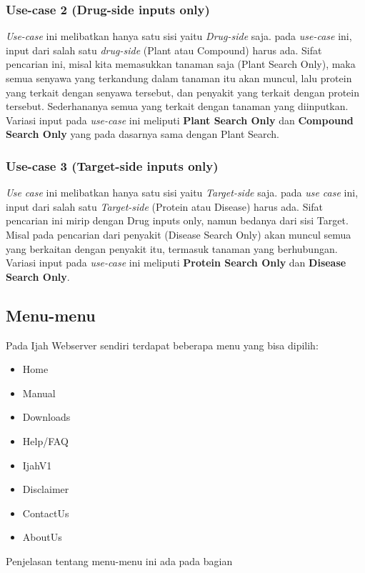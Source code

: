 		\subsubsection{Use-case 2 (Drug-side inputs only)} \label{sssec:drug only}
		\emph{Use-case} ini melibatkan hanya satu sisi yaitu \emph{Drug-side} saja. pada \emph{use-case} ini, input dari salah satu \emph{drug-side} (Plant atau Compound) harus ada. Sifat pencarian ini, misal kita memasukkan tanaman saja (Plant Search Only), maka semua senyawa yang terkandung dalam tanaman itu akan muncul, lalu protein yang terkait dengan senyawa tersebut, dan penyakit yang terkait dengan protein tersebut. Sederhananya semua yang terkait dengan tanaman yang diinputkan. Variasi input pada \emph{use-case} ini meliputi \textbf{Plant Search Only} dan \textbf{Compound Search Only} yang pada dasarnya sama dengan Plant Search.
		\subsubsection{Use-case 3 (Target-side inputs only)} \label{sssec:target only}
		\emph{Use case} ini melibatkan hanya satu sisi yaitu \emph{Target-side} saja. pada \emph{use case} ini, input dari salah satu \emph{Target-side} (Protein atau Disease) harus ada. Sifat pencarian ini mirip dengan Drug inputs only, namun bedanya dari sisi Target. Misal pada pencarian dari penyakit (Disease Search Only) akan muncul semua yang berkaitan dengan penyakit itu, termasuk tanaman yang berhubungan. Variasi input pada \emph{use-case} ini meliputi \textbf{Protein Search Only} dan \textbf{Disease Search Only}.


	\subsection{Menu-menu} %
	Pada Ijah Webserver sendiri terdapat beberapa menu yang bisa dipilih:
	\begin{itemize}
	\item Home
	\item Manual
	\item Downloads
	\item Help/FAQ
	\item IjahV1
	\item Disclaimer
	\item ContactUs
	\item AboutUs
	\end{itemize}
	Penjelasan tentang menu-menu ini ada pada bagian \textbf{}


